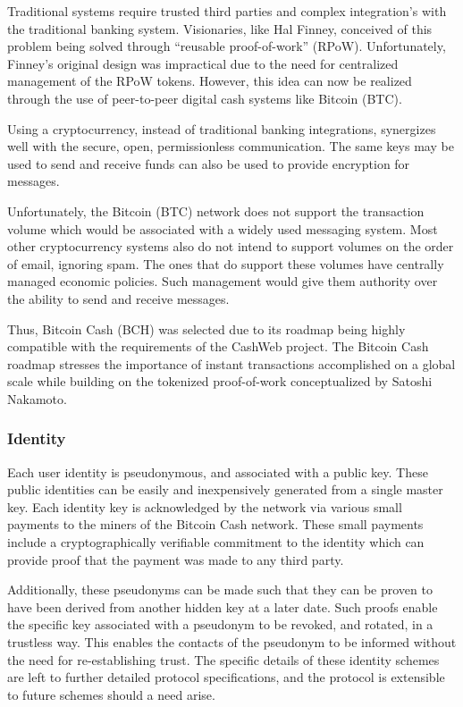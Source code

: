 \documentclass{article}
\begin{document}
Traditional systems require trusted third parties and complex integration's with the traditional banking system. Visionaries, like Hal Finney, conceived of this problem being solved through ``reusable proof-of-work'' (RPoW). Unfortunately, Finney's original design was impractical due to the need for centralized management of the RPoW tokens. However, this idea can now be realized through the use of peer-to-peer digital cash systems like Bitcoin (BTC).

Using a cryptocurrency, instead of traditional banking integrations, synergizes well with the secure, open, permissionless communication. The same keys may be used to send and receive funds can also be used to provide encryption for messages.

Unfortunately, the Bitcoin (BTC) network does not support the transaction volume which would be associated with a widely used messaging system. Most other cryptocurrency systems also do not intend to support volumes on the order of email, ignoring spam. The ones that do support these volumes have centrally managed economic policies. Such management would give them authority over the ability to send and receive messages.

Thus, Bitcoin Cash (BCH) was selected due to its roadmap being highly compatible with the requirements of the CashWeb project. The Bitcoin Cash roadmap stresses the importance of instant transactions accomplished on a global scale while building on the tokenized proof-of-work conceptualized by Satoshi Nakamoto.

\subsubsection{Identity}

Each user identity is pseudonymous, and associated with a public key. These public identities can be easily and inexpensively generated from a single master key. Each identity key is acknowledged by the network via various small payments to the miners of the Bitcoin Cash network. These small payments include a cryptographically verifiable commitment to the identity which can provide proof that the payment was made to any third party.

Additionally, these pseudonyms can be made such that they can be proven to have been derived from another hidden key at a later date. Such proofs enable the specific key associated with a pseudonym to be revoked, and rotated, in a trustless way. This enables the contacts of the pseudonym to be informed without the need for re-establishing trust. The specific details of these identity schemes are left to further detailed protocol specifications, and the protocol is extensible to future schemes should a need arise.
\end{document}
